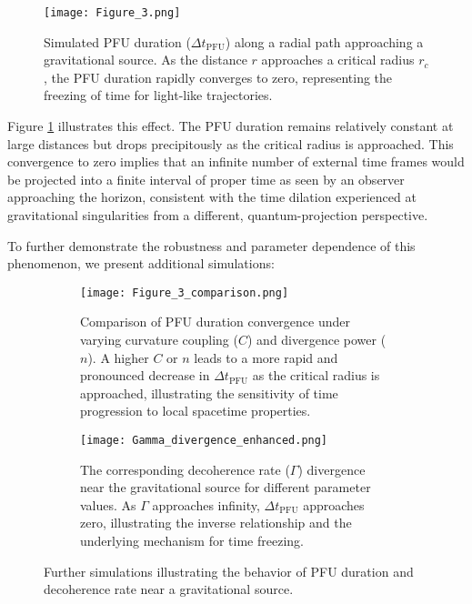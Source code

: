\documentclass[12pt,a4paper]{article}
\numberwithin{equation}{section}
\begin{document}
\begin{figure}[H]
\centering
\texttt{[image: Figure\_3.png]} %
\caption{Simulated PFU duration ($\Delta t_{\text{PFU}}$) along a radial path approaching a gravitational source. As the distance $r$ approaches a critical radius $r_c$, the PFU duration rapidly converges to zero, representing the freezing of time for light-like trajectories.}
\label{fig:pfu_time_freeze}
\end{figure}

Figure \ref{fig:pfu_time_freeze} illustrates this effect. The PFU duration remains relatively constant at large distances but drops precipitously as the critical radius is approached. This convergence to zero implies that an infinite number of external time frames would be projected into a finite interval of proper time as seen by an observer approaching the horizon, consistent with the time dilation experienced at gravitational singularities from a different, quantum-projection perspective.

To further demonstrate the robustness and parameter dependence of this phenomenon, we present additional simulations:

\begin{figure}[H]
\centering
\begin{subfigure}[b]{0.8\textwidth}
    \centering
    \texttt{[image: Figure\_3\_comparison.png]} %
    \caption{Comparison of PFU duration convergence under varying curvature coupling ($C$) and divergence power ($n$). A higher $C$ or $n$ leads to a more rapid and pronounced decrease in $\Delta t_{\text{PFU}}$ as the critical radius is approached, illustrating the sensitivity of time progression to local spacetime properties.}
    \label{fig:pfu_time_freeze_comparison}
\end{subfigure}
\vspace{1em} %
\begin{subfigure}[b]{0.8\textwidth}
    \centering
    \texttt{[image: Gamma\_divergence\_enhanced.png]} %
    \caption{The corresponding decoherence rate ($\Gamma$) divergence near the gravitational source for different parameter values. As $\Gamma$ approaches infinity, $\Delta t_{\text{PFU}}$ approaches zero, illustrating the inverse relationship and the underlying mechanism for time freezing.}
    \label{fig:gamma_divergence_enhanced}
\end{subfigure}
\caption{Further simulations illustrating the behavior of PFU duration and decoherence rate near a gravitational source.}
\end{figure}
\end{document}

